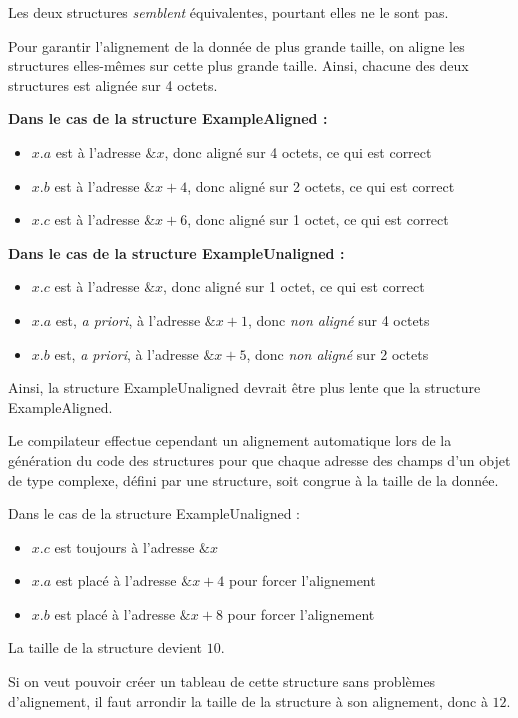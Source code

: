 \documentclass[../../../main.tex]{subfiles}
\begin{document}
Les deux structures \textit{semblent} équivalentes, pourtant elles ne le sont pas.

Pour garantir l'alignement de la donnée de plus grande taille, on aligne les structures elles-mêmes sur cette plus grande taille. Ainsi, chacune des deux structures est alignée sur 4 octets.

\textbf{Dans le cas de la structure \textsf{ExampleAligned} :}
\begin{itemize}
	\item $x.a$ est à l'adresse $\&x$, donc aligné sur 4 octets, ce qui est correct
	\item $x.b$ est à l'adresse $\&x + 4$, donc aligné sur 2 octets, ce qui est correct
	\item $x.c$ est à l'adresse $\&x + 6$, donc aligné sur 1 octet, ce qui est correct
\end{itemize}

\textbf{Dans le cas de la structure \textsf{ExampleUnaligned} :}
\begin{itemize}
	\item $x.c$ est à l'adresse $\&x$, donc aligné sur 1 octet, ce qui est correct
	\item $x.a$ est, \textit{a priori}, à l'adresse $\&x + 1$, donc \textit{non aligné} sur 4 octets
	\item $x.b$ est, \textit{a priori}, à l'adresse $\&x + 5$, donc \textit{non aligné} sur 2 octets 
\end{itemize}

Ainsi, la structure \textsf{ExampleUnaligned} devrait être plus lente que la structure \textsf{ExampleAligned}.

Le compilateur effectue cependant un alignement automatique lors de la génération du code des structures pour que chaque adresse des champs d'un objet de type complexe, défini par une structure, soit congrue à la taille de la donnée.

Dans le cas de la structure \textsf{ExampleUnaligned} :
\begin{itemize}
	\item $x.c$ est toujours à l'adresse $\&x$
	\item $x.a$ est placé à l'adresse $\&x + 4$ pour forcer l'alignement
	\item $x.b$ est placé à l'adresse $\&x + 8$ pour forcer l'alignement
\end{itemize}
La taille de la structure devient $10$.

Si on veut pouvoir créer un tableau de cette structure sans problèmes d'alignement, il faut arrondir la taille de la structure à son alignement, donc à $12$.
\end{document}
